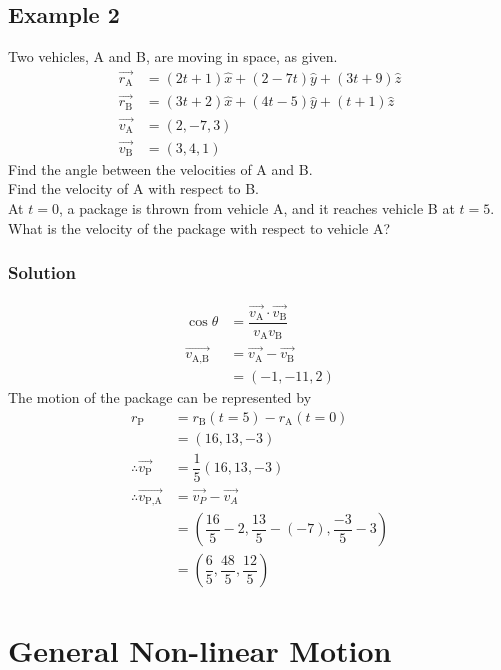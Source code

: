 \documentclass[fleqn]{article}
\begin{document}
\subsection{Example 2}
Two vehicles, A and B, are moving in space, as given.
\begin{align*}
	\overrightarrow{r_\text{A}} &= (2t + 1) \hat{x} + (2 - 7t) \hat{y} + (3t + 9) \hat{z} \\
	\overrightarrow{r_\text{B}} &= (3t + 2) \hat{x} + (4t - 5) \hat{y} + (t + 1) \hat{z} \\
	\overrightarrow{v_\text{A}} &= (2, -7, 3) \\
	\overrightarrow{v_\text{B}} &= (3, 4, 1)
\end{align*}
Find the angle between the velocities of A and B.\\
Find the velocity of A with respect to B. \\
At $t=0$, a package is thrown from vehicle A, and it reaches vehicle B at $t=5$. What is the velocity of the package with respect to vehicle A?
\subsubsection*{Solution}

\begin{align*}
	\cos \theta &= \dfrac{\overrightarrow{v_\text{A}} \cdot \overrightarrow{v_\text{B}}}{v_\text{A} v_\text{B}} \\
	\overrightarrow{v_{\text{A,B}}} &= \overrightarrow{v_\text{A}} - \overrightarrow{v_\text{B}} \\
	&= (-1, -11, 2)
\end{align*}
The motion of the package can be represented by 
\begin{align*}
	r_\text{P} &= r_\text{B} (t=5) - r_\text{A}(t=0)\\
	&= (16, 13, -3)\\
	\therefore \overrightarrow{v_\text{P}} &= \dfrac{1}{5} (16, 13, -3)\\
	\therefore \overrightarrow{v_\text{P,A}} &= \overrightarrow{v_P} - \overrightarrow{v_A}\\
	&= \left( \dfrac{16}{5} - 2 , \dfrac{13}{5} - (-7), \dfrac{-3}{5} - 3 \right) \\
	&= \left(\dfrac{6}{5} , \dfrac{48}{5}, \dfrac{12}{5}\right)
\end{align*}

\section{General Non-linear Motion}
\end{document}
